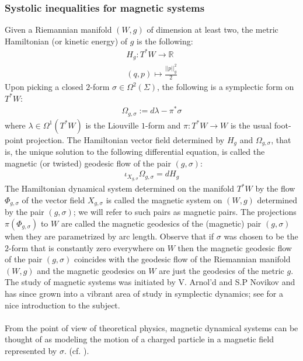 \documentclass[11pt]{amsart}
\theoremstyle{plain}
\theoremstyle{definition}
\theoremstyle{remark}
\begin{document}
\subsubsection{Systolic inequalities for magnetic systems}\label{mag_sys_sec_intro}
Given a Riemannian manifold $(W,g)$ of dimension at least two, the metric Hamiltonian (or kinetic energy) of $g$ is the following:
\begin{align}
    H_g: T^*W \rightarrow \mathbb{R}\\\nonumber
    (q,p)\mapsto \frac{\vert\vert p\vert\vert^2_g}{2}
\end{align}
Upon picking a closed $2$-form $\sigma \in \Omega^2(\Sigma)$, the following is a symplectic form on $T^*W$:
\begin{align}\label{mag_form_def_intro}
    \Omega_{g,\sigma}:= d\lambda - \pi^*\sigma 
\end{align}
where $\lambda \in \Omega^1(T^*W)$ is the Liouville $1$-form and $\pi:T^*W \rightarrow W$ is the usual foot-point projection. The Hamiltonian vector field determined by $H_g$ and $\Omega_{g,\sigma}$, that is, the unique solution to the following differential equation, is called the magnetic (or twisted) geodesic flow of the pair $(g,\sigma)$:
\begin{align}
    \iota_{X_{g,\sigma}}\Omega_{g,\sigma} = dH_{g}
\end{align}
The Hamiltonian dynamical system determined on the manifold $T^*W$ by the flow $\Phi_{g,\sigma}$ of the vector field $X_{g,\sigma}$ is called the magnetic system on $(W,g)$ determined by the pair $(g,\sigma)$; we will refer to such pairs as magnetic pairs. The projections $\pi(\Phi_{g,\sigma})$ to $W$ are called the magnetic geodesics of the (magnetic) pair $(g,\sigma)$ when they are parametrized by arc length. Observe that if $\sigma$ was chosen to be the $2$-form that is constantly zero everywhere on $W$ then the magnetic geodesic flow of the pair $(g,\sigma)$ coincides with the geodesic flow of the Riemannian manifold $(W,g)$ and the magnetic geodesics on $W$ are just the geodesics of the metric $g$. The study of magnetic systems was initiated by V. Arnol'd \cite{Arnold1988} and S.P Novikov \cite{Novikov} and has since grown into a vibrant area of study in symplectic dynamics; see \cite{CieliebakFrauenfelderPaternain2010} for a nice introduction to the subject.\\
\\
From the point of view of theoretical physics, magnetic dynamical systems can be thought of as modeling the motion of a charged particle in a magnetic field represented by $\sigma$. (cf. \cite{CieliebakFrauenfelderPaternain2010}). \\
\end{document}
